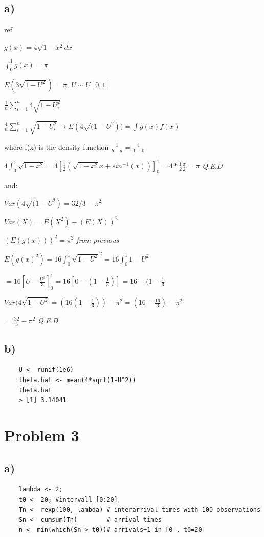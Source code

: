 \documentclass[a4paper, 11pt]{article}
\begin{document}
\subsection*{a)}
{
ref \cite{referencja}

$g(x) = 4\sqrt{1-x^2} dx$

$\int_{0}^{1} g(x) = \pi$

$E(3\sqrt{1-U^2}) = \pi$, $U \sim U[0,1]$
  
$\frac{1}{n}\sum_{i=1}^{n}4\sqrt{1-U_i^2}$

$\frac{4}{n}\sum_{i=1}^{n}\sqrt{1-U_i^2} \rightarrow E(4\sqrt(1-U^2)) = \int g(x)f(x)$

where f(x) is the density function $\frac{1}{b-a} = \frac{1}{1-0}$

$4 \int_{0}^{1} \sqrt{1-x^2} = 4 [\frac{1}{2} (\sqrt{1-x^2} {} x + sin^{-1}(x)) ]_{0}^{1} = 4 * \frac{1}{2}\frac{\pi}{2} = \pi$ \emph{Q.E.D}

\newpage
and:

$Var(4\sqrt(1-U^2) = 32/3 -\pi^2$

$Var(X) = E(X^2) - (E(X))^2$

$(E(g(x)))^2 = \pi^2 $ \emph{from previous}

$E(g(x)^2) = 16\int_{0}^{1} \sqrt{1-U^2}^2 = 16\int_{0}^{1} 1-U^2$

$=16[U-\frac{U^3}{3}]_{0}^{1} = 16[0-(1-\frac{1}{3})] = 16-(1-\frac{1}{3}$

$Var(4\sqrt{1-U^2} = (16(1-\frac{1}{3})) - \pi^2 = (16-\frac{16}{3}) - \pi^2$

$= \frac{32}{3} - \pi^2$ \emph{Q.E.D}
}


\subsection*{b)}
\begin{center}
  \begin{lstlisting}
    U <- runif(1e6)
    theta.hat <- mean(4*sqrt(1-U^2))
    theta.hat
    > [1] 3.14041
  \end{lstlisting}
\end{center}

\section*{Problem 3}
\subsection*{a)}
\begin{center}
  \begin{lstlisting}
    lambda <- 2;
    t0 <- 20; #intervall [0:20]
    Tn <- rexp(100, lambda) # interarrival times with 100 observations
    Sn <- cumsum(Tn)        # arrival times
    n <- min(which(Sn > t0))# arrivals+1 in [0 , t0=20]
  \end{lstlisting}
\end{center}
\end{document}
